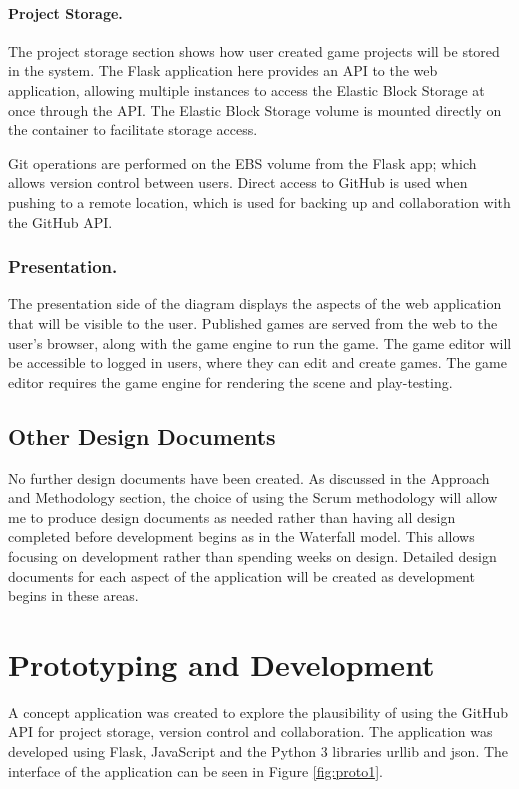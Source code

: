 \documentclass[a4paper, 12pt]{article}
\begin{document}
\paragraph{Project Storage.}
The project storage section shows how user created game projects will be stored in the system. The Flask application here provides an API to the web application, allowing multiple instances to access the Elastic Block Storage at once through the API. The Elastic Block Storage volume is mounted directly on the container to facilitate storage access.

Git operations are performed on the EBS volume from the Flask app; which allows version control between users. Direct access to GitHub is used when pushing to a remote location, which is used for backing up and collaboration with the GitHub API.

\subsubsection{Presentation.}
The presentation side of the diagram displays the aspects of the web application that will be visible to the user. Published games are served from the web to the user's browser, along with the game engine to run the game. The game editor will be accessible to logged in users, where they can edit and create games. The game editor requires the game engine for rendering the scene and play-testing.

\subsection{Other Design Documents}
No further design documents have been created. As discussed in the Approach and Methodology section, the choice of using the Scrum methodology will allow me to produce design documents as needed rather than having all design completed before development begins as in the Waterfall model. This allows focusing on development rather than spending weeks on design. Detailed design documents for each aspect of the application will be created as development begins in these areas.

\section{Prototyping and Development}
A concept application was created to explore the plausibility of using the GitHub API for project storage, version control and collaboration. The application was developed using Flask, JavaScript and the Python 3 libraries urllib and json. The interface of the application can be seen in Figure \ref{fig:proto1}.
\end{document}
